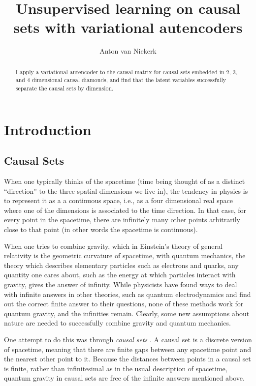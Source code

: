 \documentclass[letterpaper,10pt]{article}
\title{Unsupervised learning on causal sets with variational autencoders}
\author{Anton van Niekerk}
\begin{document}
\maketitle

\begin{abstract}
I apply a variational autencoder to the causal matrix for causal sets embedded in $2$, $3$, and $4$ dimensional causal diamonds, 
and find that the latent variables successfully separate the causal sets by dimension.
\end{abstract}


\section{Introduction}

\subsection{Causal Sets}

When one typically thinks of the spacetime (time being thought of as a distinct ``direction'' to the three spatial dimensions we live in), 
the tendency in physics is to represent it as a a continuous space, i.e., as a four dimensional real
space where one of the dimensions is associated to the time direction.  In that case, for every point in the spacetime, there are infinitely many other 
points arbitrarily close to that point (in other words the spacetime is continuous).

When one tries to combine gravity, which in Einstein's theory of general relativity is the geometric curvature of spacetime, 
with quantum mechanics, the theory which describes elementary particles such as electrons and quarks, any quantity one cares about, such as the 
energy at which particles interact with gravity, gives the answer of infinity.  While physicists have found ways to deal with infinite answers in other 
theories, such as quantum electrodynamics and find out the correct finite answer to their questions, none of these methods work for quantum gravity, and 
the infinities remain.  Clearly, some new assumptions about nature are needed to successfully combine gravity and quantum mechanics.

One attempt to do this was through {\it causal sets} \cite{causalsets}.  A causal set is a discrete version of spacetime, meaning that there are finite gaps 
between any spacetime point and the nearest other point to it.  Because the distances between points in a causal set is finite, rather than infinitesimal 
as in the usual description of spacetime, quantum gravity in causal sets are free of the infinite answers mentioned above.
\end{document}

